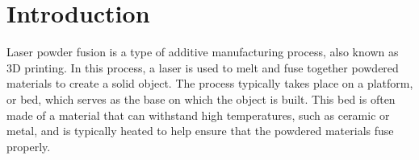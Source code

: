 \chapter{Introduction}
\label{chp:introduction}

    Laser powder fusion is a type of additive manufacturing process, also known as 3D printing. In this process, a laser is used to melt and fuse together powdered materials to create a solid object. The process typically takes place on a platform, or bed, which serves as the base on which the object is built. This bed is often made of a material that can withstand high temperatures, such as ceramic or metal, and is typically heated to help ensure that the powdered materials fuse properly.\\
